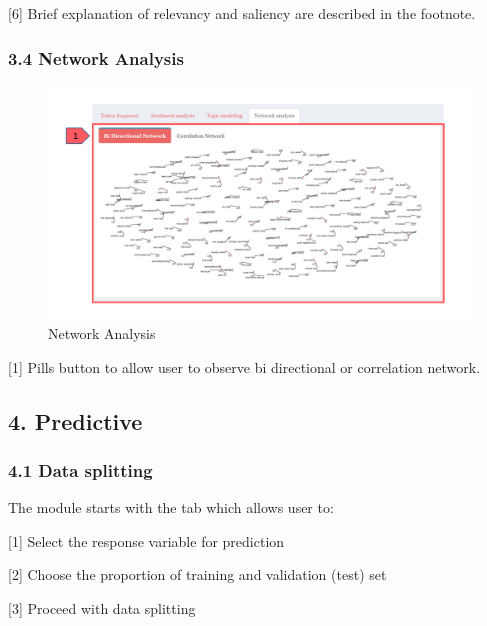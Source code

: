 \documentclass[
  12pt,
]{article}
\begin{document}
{[}6{]} Brief explanation of relevancy and saliency are described in the
footnote.

\hypertarget{network-analysis}{%
\subsubsection{3.4 Network Analysis}\label{network-analysis}}

\begin{figure}[H]

{\centering \includegraphics[width=0.95\linewidth]{images/network} 

}

\caption{Network Analysis}\label{fig:unnamed-chunk-17}
\end{figure}

{[}1{]} Pills button to allow user to observe bi directional or
correlation network.

\hypertarget{predictive}{%
\subsection{4. Predictive}\label{predictive}}

\hypertarget{data-splitting}{%
\subsubsection{4.1 Data splitting}\label{data-splitting}}

The module starts with the tab which allows user to:

{[}1{]} Select the response variable for prediction

{[}2{]} Choose the proportion of training and validation (test) set

{[}3{]} Proceed with data splitting
\end{document}
